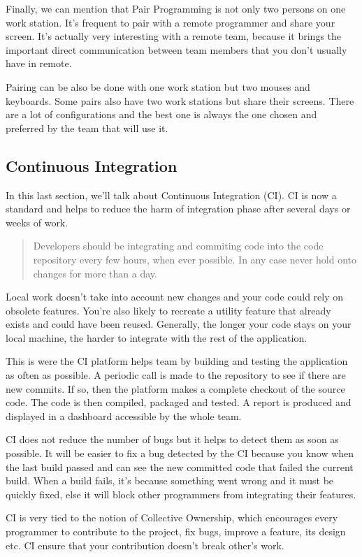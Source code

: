 Finally, we can mention that Pair Programming is not only two persons on
one work station.
It's frequent to pair with a remote programmer and share your screen.
It's actually very interesting with a remote team, because it brings the
important direct communication between team members that you don't
usually have in remote.

Pairing can be also be done with one work station but two mouses and
keyboards.
Some pairs also have two work stations but share their screens.
There are a lot of configurations and the best one is always the one
chosen and preferred by the team that will use it.

\subsection{Continuous Integration}\label{subsec:continuous-integration}
In this last section, we'll talk about Continuous Integration (CI).
CI is now a standard and helps to reduce the harm of integration phase
after several days or weeks of work.

\begin{quotation}
    Developers should be integrating and commiting code into the code
    repository every few hours, when ever possible.
    In any case never hold onto changes for more than a day.
\end{quotation}

Local work doesn't take into account new changes and your code could rely
on obsolete features.
You're also likely to recreate a utility feature that already exists and
could have been reused.
Generally, the longer your code stays on your local machine, the harder
to integrate with the rest of the application.

This is were the CI platform helps team by building and testing
the application as often as possible.
A periodic call is made to the repository to see if there are new
commits.
If so, then the platform makes a complete checkout of the source code.
The code is then compiled, packaged and tested.
A report is produced and displayed in a dashboard accessible by the
whole team.

CI does not reduce the number of bugs but it helps to detect them as soon
as possible.
It will be easier to fix a bug detected by the CI because you know when
the last build passed and can see the new committed code that failed
the current build.
When a build fails, it's because something went wrong and it must be
quickly fixed, else it will block other programmers from integrating
their features.

CI is very tied to the notion of Collective Ownership, which
encourages every programmer to contribute to the project, fix bugs,
improve a feature, its design etc.
CI ensure that your contribution doesn't break other's work.

